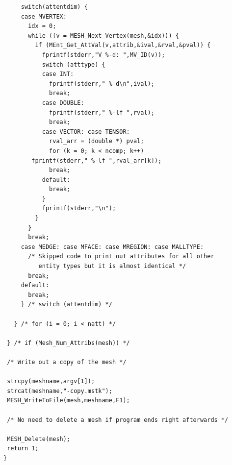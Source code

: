 \documentclass[12pt]{article}
\begin{document}
\begin{verbatim}
     switch(attentdim) {
     case MVERTEX:
       idx = 0;
       while ((v = MESH_Next_Vertex(mesh,&idx))) {
         if (MEnt_Get_AttVal(v,attrib,&ival,&rval,&pval)) {
           fprintf(stderr,"V %-d: ",MV_ID(v));
           switch (atttype) {
           case INT:
             fprintf(stderr," %-d\n",ival);
             break;
           case DOUBLE: 
             fprintf(stderr," %-lf ",rval);
             break;
           case VECTOR: case TENSOR:
             rval_arr = (double *) pval;
             for (k = 0; k < ncomp; k++)
       	fprintf(stderr," %-lf ",rval_arr[k]);
             break;
           default:
             break;
           }
           fprintf(stderr,"\n");
         }
       }
       break;
     case MEDGE: case MFACE: case MREGION: case MALLTYPE:
       /* Skipped code to print out attributes for all other
          entity types but it is almost identical */
       break;	
     default:
       break;
     } /* switch (attentdim) */

   } /* for (i = 0; i < natt) */
   
 } /* if (Mesh_Num_Attribs(mesh)) */
  
 /* Write out a copy of the mesh */

 strcpy(meshname,argv[1]);
 strcat(meshname,"-copy.mstk");
 MESH_WriteToFile(mesh,meshname,F1);

 /* No need to delete a mesh if program ends right afterwards */

 MESH_Delete(mesh);
 return 1;
}
\end{verbatim}
\end{document}
